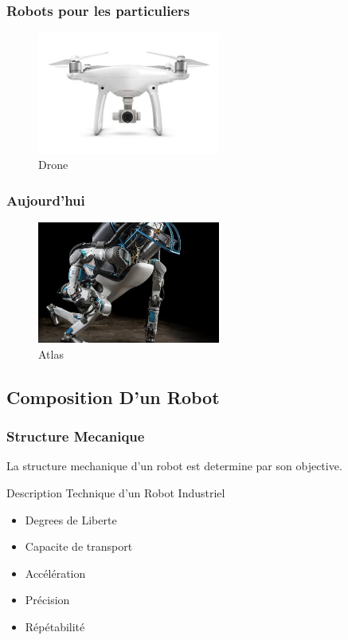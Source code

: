 \documentclass{beamer}
\begin{document}
\begin{frame}
  \frametitle{Robots pour les particuliers}
  \begin{figure}[!h]
  \centering
  \includegraphics[width=6cm]{drone.jpg}
  \caption{Drone}
  \end{figure}
\end{frame}

\begin{frame}
  \frametitle{Aujourd'hui}
  \begin{figure}[!h]
  \centering
  \includegraphics[width=6cm]{header-bkg-atlas_0.jpg}
  \caption{Atlas}
  \end{figure}
\end{frame}



\subsection{Composition D'un Robot}
\begin{frame}
  \frametitle{Structure Mecanique}
  \begin{block}{ }
  La structure mechanique d'un robot est determine par son objective.
  \end{block}
  \begin{block}{Description Technique d'un Robot Industriel}
  \begin{itemize}
      \item Degrees de Liberte
      \item Capacite de transport
      \item Accélération 
      \item Précision
      \item Répétabilité
  \end{itemize}
  \end{block}
\end{frame}
\end{document}
